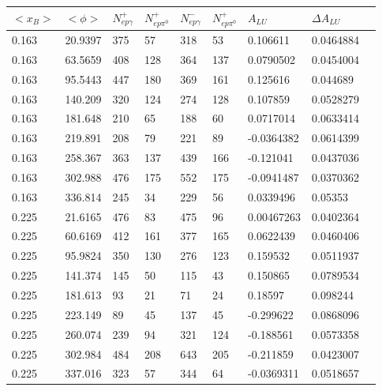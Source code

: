 \documentclass[12pt]{article}
\begin{document}
\begin{table}[!h]
   \begin{center}
      \begin{tabular}{||l|l|l|l|l|l|l|l|l||}
         \hline
 
$<x_{B}>$ & $<\phi>$   &$N^{+}_{ep\gamma}$    &$N^{+}_{ep\pi^{0}}$   
         &$N^{-}_{ep\gamma}$   &$N^{+}_{ep\pi^{0}}$    &$A_{LU}$    &$\Delta 
         A_{LU}$\\
\hline
\hline
0.163    &20.9397     &375    &57   &318   &53    &0.106611    &0.0464884\\
0.163    &63.5659     &408    &128   &364   &137    &0.0790502    &0.0454004\\
0.163    &95.5443     &447    &180   &369   &161    &0.125616    &0.044689\\
0.163    &140.209     &320    &124   &274   &128    &0.107859    &0.0528279\\
0.163    &181.648     &210    &65   &188   &60    &0.0717014    &0.0633414\\
0.163    &219.891     &208    &79   &221   &89    &-0.0364382    &0.0614399\\
0.163    &258.367      &363    &137   &439   &166    &-0.121041    &0.0437036\\
0.163    &302.988        &476    &175   &552   &175    &-0.0941487    &0.0370362\\
0.163    &336.814      &245    &34   &229   &56    &0.0339496    &0.05353\\
\hline
0.225    &21.6165    &476    &83   &475   &96    &0.00467263    &0.0402364\\
0.225    &60.6169     &412    &161   &377   &165    &0.0622439    &0.0460406\\
0.225    &95.9824     &350    &130   &276   &123    &0.159532    &0.0511937\\
0.225    &141.374     &145    &50   &115   &43    &0.150865    &0.0789534\\
0.225    &181.613     &93    &21   &71   &24    &0.18597    &0.098244\\
0.225    &223.149     &89    &45   &137   &45    &-0.299622    &0.0868096\\
0.225    &260.074     &239    &94   &321   &124    &-0.188561    &0.0573358\\
0.225    &302.984     &484    &208   &643   &205    &-0.211859    &0.0423007\\
0.225    &337.016     &323    &57   &344   &64    &-0.0369311    &0.0518657\\

\end{tabular}
\end{center}
\end{table}
\end{document}
